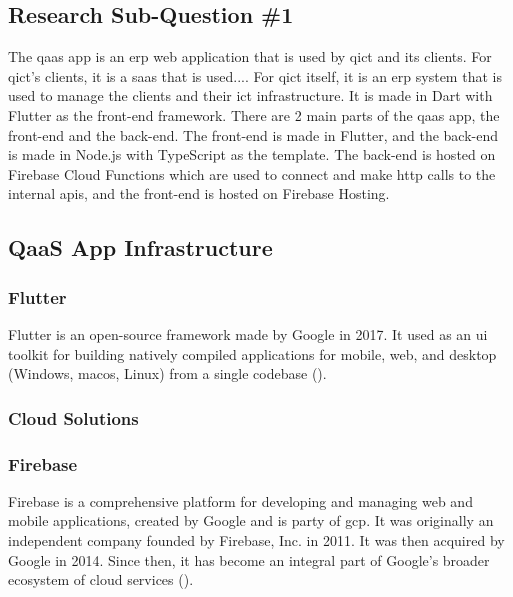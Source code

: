 \begin{multicols}{2}
      \section{Research Sub-Question \#1}
      The \acrshort{qaas} app is an \acrshort{erp} web application that is used by \acrshort{qict} and its clients.
      For \acrshort{qict}'s clients, it is a \acrshort{saas} that is used.... For \acrshort{qict} itself, it is an
      \acrshort{erp} system that is used to manage the clients and their \acrshort{ict} infrastructure.
      It is made in Dart with Flutter as the front-end framework. There are 2 main parts of the \acrshort{qaas} app, the
      front-end and the back-end. The front-end is made in Flutter, and the back-end is made in Node.js with TypeScript
      as the template. The back-end is hosted on Firebase Cloud Functions which are used to connect and make
      \acrshort{http} calls to the internal \acrshort{api}s, and the front-end is hosted on Firebase Hosting.

      \subsection{QaaS App Infrastructure}
      \subsubsection{Flutter}
      Flutter is an open-source framework made by Google in 2017. It used as an \acrshort{ui} toolkit for building
      natively compiled applications for mobile, web, and desktop (Windows, mac\acrshort{os}, Linux) from a single
      codebase (\cite{flutter}).

      \subsubsection{Cloud Solutions}
      \subsubsection{Firebase}
      Firebase is a comprehensive platform for developing and managing web and mobile applications, created by
      Google and is party of \acrshort{gcp}. It was originally an independent company founded by Firebase, Inc.
      in 2011. It was then acquired by Google in 2014. Since then, it has become an integral part of Google's
      broader ecosystem of cloud services (\cite{firebase}).


\end{multicols}
